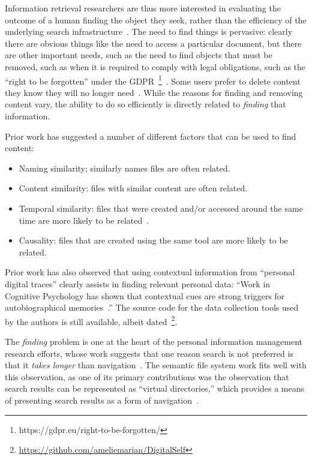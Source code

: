 Information retrieval researchers are thus more interested in evaluating the
outcome of a human finding the object they seek, rather than the efficiency of
the underlying search infrastructure~\cite{bergman2019factors}. The need to find
things is pervasive: clearly there are obvious things like the need to access a
particular document, but there are other important needs, such as the need to
find objects that must be removed, such as when it is required to comply with
legal obligations, such as the ``right to be forgotten'' under the
GDPR~\footnote{https://gdpr.eu/right-to-be-forgotten/}~\cite{ritzdorf2014assisted}.
Some users prefer to delete content they know they will no longer
need~\cite{Vitale_2020}.  While the reasons for finding and removing content
vary, the ability to do so efficiently is directly related to \emph{finding}
that information.

Prior work has suggested a number of different factors that can be used to find
content:

\begin{itemize}
    \item Naming similarity; similarly names files are often related.
    \item Content similarity: files with similar content are often related.
    \item Temporal similarity: files that were created and/or accessed around
          the same time are more likely to be related~\cite{soules2003can}.
    \item Causality: files that are created using the same tool
          are more likely to be related.
\end{itemize}

Prior work has also observed that using contextual information from ``personal
digital traces'' clearly assists in finding relevant personal data: ``Work in
Cognitive Psychology has shown that contextual cues are strong triggers for
autobiographical memories~\cite{vianna2019searching}.''  The source code for the
data collection tools used by the authors is still available, albeit
dated~\footnote{\url{https://github.com/ameliemarian/DigitalSelf}}.

The \emph{finding} problem is one at the heart of the personal information
management research efforts, whose work suggests that one reason search is not
preferred is that it \emph{takes longer} than
navigation~\cite{bergman2019search}.  The semantic file system work fits well
with this observation, as one of its primary contributions was the observation
that search results can be represented as ``virtual directories,'' which
provides a means of presenting search results as a form of
navigation~\cite{gifford1991semantic}.

